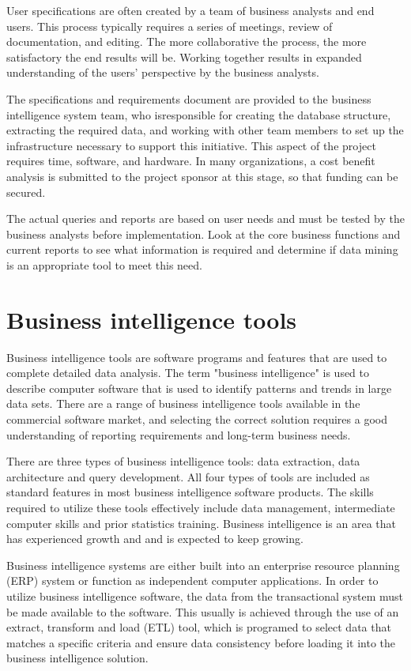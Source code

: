 User specifications are often created by a team of business analysts and end users. This process typically requires a series of meetings, review of documentation, and editing. The more collaborative the process, the more satisfactory the end results will be. Working together results in expanded understanding of the users' perspective by the business analysts.

The specifications and requirements document are provided to the business intelligence system team, who isresponsible for creating the database structure, extracting the required data, and working with other team members to set up the infrastructure necessary to support this initiative. This aspect of the project requires time, software, and hardware. In many organizations, a cost benefit analysis is submitted to the project sponsor at this stage, so that funding can be secured.

The actual queries and reports are based on user needs and must be tested by the business analysts before implementation. Look at the core business functions and current reports to see what information is required and determine if data mining is an appropriate tool to meet this need.

\section{Business intelligence tools}
Business intelligence tools are software programs and features that are used to complete detailed data analysis. The term "business intelligence" is used to describe computer software that is used to identify patterns and trends in large data sets. There are a range of business intelligence tools available in the commercial software market, and selecting the correct solution requires a good understanding of reporting requirements and long-term business needs.

There are three types of business intelligence tools: data extraction, data architecture and query development. All four types of tools are included as standard features in most business intelligence software products. The skills required to utilize these tools effectively include data management, intermediate computer skills and prior statistics training. Business intelligence is an area that has experienced growth and and is expected to keep growing.

Business intelligence systems are either built into an enterprise resource planning (ERP) system or function as independent computer applications. In order to utilize business intelligence software, the data from the transactional system must be made available to the software. This usually is achieved through the use of an extract, transform and load (ETL) tool, which is programed to select data that matches a specific criteria and ensure data consistency before loading it into the business intelligence solution.

